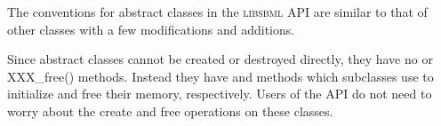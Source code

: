 \documentclass{sbmlmanual}
\newcommand{\libsbml}{\textsc{libsbml}}
\begin{document}
The conventions for abstract classes in the \libsbml{} API are similar to
that of other classes with a few modifications and additions.

Since abstract classes cannot be created or destroyed directly, they have
no  or {XXX\_free()} methods.  Instead they have
 and  methods which subclasses use
to initialize and free their memory, respectively.  Users of the API do not
need to worry about the create and free operations on these classes.










\end{document}
